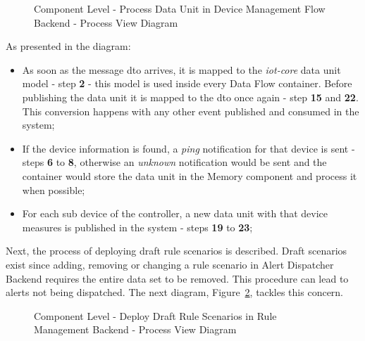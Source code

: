 \begin{figure}[H]
   \centering
   \resizebox{\columnwidth}{!}
   {
      
   }
   \caption[Component Level - Process Data Unit in Device Management Flow Backend - Process View Diagram]{Component Level - Process Data Unit in Device Management Flow Backend - Process View Diagram}
   \label{fig:design:architecture:platform:component:process:diagram:device}
\end{figure}

As presented in the diagram:

\begin{itemize}
   \item As soon as the message dto arrives, it is mapped to the \textit{iot-core} data unit model - step \textbf{2} - this model is used inside every Data Flow container. Before publishing the data unit it is mapped to the dto once again - step \textbf{15} and \textbf{22}. This conversion happens with any other event published and consumed in the system;
   \item If the device information is found, a \textit{ping} notification for that device is sent - steps \textbf{6} to \textbf{8}, otherwise an \textit{unknown} notification would be sent and the container would store the data unit in the Memory component and process it when possible;
   \item For each sub device of the controller, a new data unit with that device measures is published in the system - steps \textbf{19} to \textbf{23};
\end{itemize}

Next, the process of deploying draft rule scenarios is described.
Draft scenarios exist since adding, removing or changing a rule scenario in Alert Dispatcher Backend requires the entire data set to be removed. This procedure can lead to alerts not being dispatched. The next diagram, Figure~\ref{fig:design:architecture:platform:component:process:diagram:rule}, tackles this concern.

\begin{figure}[H]
   \centering
   \resizebox{\columnwidth}{!}
   {
      
   }
   \caption[Component Level - Deploy Draft Rule Scenarios in Rule Management Backend - Process View Diagram]{Component Level - Deploy Draft Rule Scenarios in Rule Management Backend - Process View Diagram}
   \label{fig:design:architecture:platform:component:process:diagram:rule}
\end{figure}

